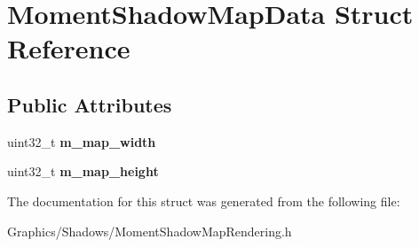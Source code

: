 \hypertarget{structMomentShadowMapData}{}\section{Moment\+Shadow\+Map\+Data Struct Reference}
\label{structMomentShadowMapData}
\subsection*{Public Attributes}
\begin{DoxyCompactItemize}
\item 
\mbox{\label{structMomentShadowMapData_a3ac583ca8353823b685cbefcf288f968}} 
uint32\+\_\+t {\bfseries m\+\_\+map\+\_\+width}
\item 
\mbox{\label{structMomentShadowMapData_a7625ac3d96c9f2a1f89bad047af7f4ba}} 
uint32\+\_\+t {\bfseries m\+\_\+map\+\_\+height}
\end{DoxyCompactItemize}


The documentation for this struct was generated from the following file\+:\begin{DoxyCompactItemize}
\item 
Graphics/\+Shadows/Moment\+Shadow\+Map\+Rendering.\+h\end{DoxyCompactItemize}
